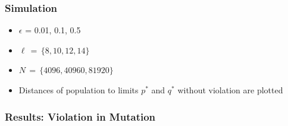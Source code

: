 \documentclass[aspectratio=169]{beamer}
\begin{document}
  
  \begin{frame}
    \frametitle{Simulation}
    \begin{itemize}
      \item{$\epsilon$ = {0.01, 0.1, 0.5}}      
      \item{$\ell \,=\, \{8, 10, 12, 14\}$}
      \item{$N \,=\, \{4096, 40960, 81920\}$}
      \item{Distances of population to limits $p^\ast$ and  $q^\ast$ without violation are plotted }
    \end{itemize}
  \end{frame}
  
  \begin{frame}
    \frametitle{Results: Violation in Mutation}
    \mbox{}\\[-0.4in]
    \begin{figure}[!h]
      \begin{center}
	 \hspace{-2.3em}%
	 \hspace{-2.3em}%

\end{center}
\end{figure}
\end{frame}
\end{document}
